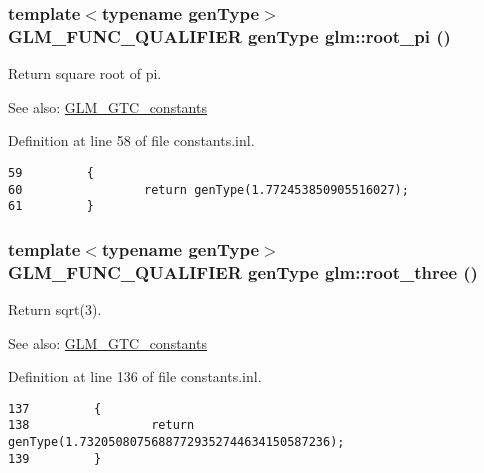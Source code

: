 \hypertarget{group__gtc__constants_g94ccd058b697006c9aacc2329edc05a0}{
\subsubsection[root\_\-pi]{\setlength{\rightskip}{0pt plus 5cm}template$<$typename genType$>$ GLM\_\-FUNC\_\-QUALIFIER genType glm::root\_\-pi ()}}
\label{group__gtc__constants_g94ccd058b697006c9aacc2329edc05a0}


Return square root of pi. \begin{Desc}
\item[See also:]\hyperlink{group__gtc__constants}{GLM\_\-GTC\_\-constants} \end{Desc}


Definition at line 58 of file constants.inl.

\begin{Code}\begin{verbatim}59         {
60                 return genType(1.772453850905516027);
61         }
\end{verbatim}
\end{Code}


\hypertarget{group__gtc__constants_g2d2fec6ccd7b739e797e402521780fe3}{
\subsubsection[root\_\-three]{\setlength{\rightskip}{0pt plus 5cm}template$<$typename genType$>$ GLM\_\-FUNC\_\-QUALIFIER genType glm::root\_\-three ()}}
\label{group__gtc__constants_g2d2fec6ccd7b739e797e402521780fe3}


Return sqrt(3). \begin{Desc}
\item[See also:]\hyperlink{group__gtc__constants}{GLM\_\-GTC\_\-constants} \end{Desc}


Definition at line 136 of file constants.inl.

\begin{Code}\begin{verbatim}137         {
138                 return genType(1.73205080756887729352744634150587236);
139         }
\end{verbatim}
\end{Code}


